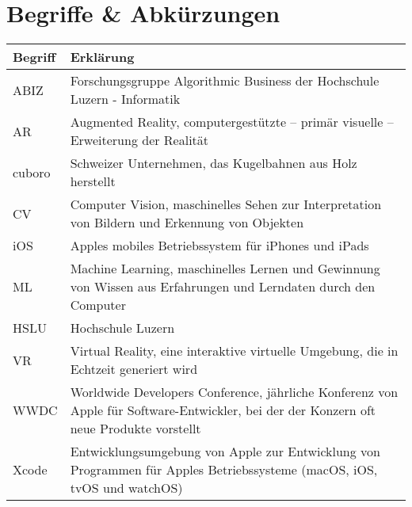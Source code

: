 \section*{Begriffe \& Abkürzungen}
\begin{table}
	\begin{tabular}{@{} p{} p{} @{}}
		\hline
		\textbf{Begriff} & \textbf{Erklärung} \\
		\hline
		ABIZ	& Forschungsgruppe Algorithmic Business der Hochschule Luzern - Informatik \\
		AR 		& Augmented Reality, computergestützte – primär visuelle – Erweiterung der Realität \\
		cuboro	& Schweizer Unternehmen, das Kugelbahnen aus Holz herstellt \\
		CV		& Computer Vision, maschinelles Sehen zur Interpretation von Bildern und Erkennung von Objekten \\
		iOS		& Apples mobiles Betriebssystem für iPhones und iPads \\
		ML		& Machine Learning, maschinelles Lernen und Gewinnung von Wissen aus Erfahrungen und Lerndaten durch den Computer \\
		HSLU	& Hochschule Luzern \\
		VR		& Virtual Reality, eine interaktive virtuelle Umgebung, die in Echtzeit generiert wird \\
		WWDC	& Worldwide Developers Conference, jährliche Konferenz von Apple für Software-Entwickler, bei der der Konzern oft neue Produkte vorstellt \\
		Xcode	& Entwicklungsumgebung von Apple zur Entwicklung von Programmen für Apples Betriebssysteme (macOS, iOS, tvOS und watchOS) \\
		\hline
	\end{tabular}
\end{table}
